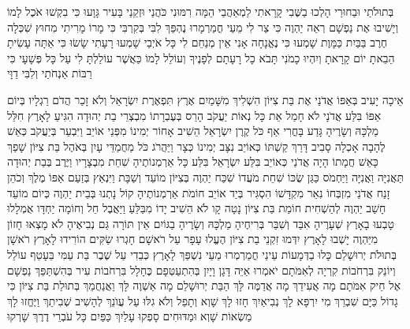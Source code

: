 \documentclass[../main/main.tex]{subfiles}
\begin{document}
\begin{multicols*}{\ncols}
בְּתוּלֹתַי וּבַחוּרַי הָלְכוּ בַשֶּׁבִי \ClosedSection{}קָרָאתִי לַמְאַהֲבַי הֵמָּה רִמּוּנִי כֹּהֲנַי וּזְקֵנַי בָּעִיר גָּוָעוּ כִּי בִקְשׁוּ אֹכֶל לָמוֹ וְיָשִׁיבוּ אֶת נַפְשָׁם \ClosedSection{}רְאֵה יַהְוֶה כִּי צַר לִי מֵעַי חֳמַרְמָרוּ נֶהְפַּךְ לִבִּי בְּקִרְבִּי כִּי מָרוֹ מָרִיתִי מִחוּץ שִׁכְּלָה חֶרֶב בַּבַּיִת כַּמָּוֶת \ClosedSection{}שָׁמְעוּ כִּי נֶאֱנָחָה אָנִי אֵין מְנַחֵם לִי כָּל אֹיְבַי שָׁמְעוּ רָעָתִי שָׂשׂוּ כִּי אַתָּה עָשִׂיתָ הֵבֵאתָ יוֹם קָרָאתָ וְיִהְיוּ כָמֹנִי \ClosedSection{}תָּבֹא כָל רָעָתָם לְפָנֶיךָ וְעוֹלֵל לָמוֹ כַּאֲשֶׁר עוֹלַלְתָּ לִי עַל כָּל פְּשָׁעָי כִּי רַבּוֹת אַנְחֹתַי וְלִבִּי דַוָּי\OpenSection{}\par
{}אֵיכָה יָעִיב בְּאַפּוֹ אֲדֹנַי אֶת בַּת צִיּוֹן הִשְׁלִיךְ מִשָּׁמַיִם אֶרֶץ תִּפְאֶרֶת יִשְׂרָאֵל וְלֹא זָכַר הֲדֹם רַגְלָיו בְּיוֹם אַפּוֹ \ClosedSection{}בִּלַּע אֲדֹנָי לֹא חָמַל אֵת כָּל נְאוֹת יַעֲקֹב הָרַס בְּעֶבְרָתוֹ מִבְצְרֵי בַת יְהוּדָה הִגִּיעַ לָאָרֶץ חִלֵּל מַלְכָּהּ\SubEnd{} וְשָׂרֶיהָ \ClosedSection{}גָּדַע בָּחֳרִי אַף כֹּל קֶרֶן יִשְׂרָאֵל הֵשִׁיב אָחוֹר יְמִינוֹ מִפְּנֵי אוֹיֵב וַיִּבְעַר בְּיַעֲקֹב כְּאֵשׁ לֶהָבָה אָכְלָה סָבִיב \ClosedSection{}דָּרַךְ קַשְׁתּוֹ כְּאוֹיֵב נִצָּב יְמִינוֹ כְּצָר וַיַּהֲרֹג כֹּל מַחֲמַדֵּי עָיִן בְּאֹהֶל בַּת צִיּוֹן שָׁפַךְ כָּאֵשׁ חֲמָתוֹ \ClosedSection{}הָיָה אֲדֹנַי כְּאוֹיֵב בִּלַּע יִשְׂרָאֵל בִּלַּע כָּל אַרְמְנוֹתֶיהָ שִׁחֵת מִבְצָרָיו וַיֶּרֶב בְּבַת יְהוּדָה תַּאֲנִיָּה וַאֲנִיָּה \ClosedSection{}וַיַּחְמֹס כַּגַּן שֻׂכּוֹ שִׁחֵת מֹעֲדוֹ שִׁכַּח יַהְוֶה בְּצִיּוֹן מוֹעֵד וְשַׁבָּת וַיִּנְאַץ בְּזַעַם אַפּוֹ מֶלֶךְ וְכֹהֵן \ClosedSection{}זָנַח אֲדֹנַי מִזְבְּחוֹ נִאֵר מִקְדָּשׁוֹ הִסְגִּיר בְּיַד אוֹיֵב חוֹמֹת אַרְמְנוֹתֶיהָ קוֹל נָתְנוּ בְּבֵית יַהְוֶה כְּיוֹם מוֹעֵד \ClosedSection{}חָשַׁב יַהְוֶה לְהַשְׁחִית חוֹמַת בַּת צִיּוֹן נָטָה קָו לֹא הֵשִׁיב יָדוֹ מִבַּלֵּעַ וַיַּאֲבֶל חֵל וְחוֹמָה יַחְדָּו אֻמְלָלוּ \ClosedSection{}טָבְעוּ בָאָרֶץ שְׁעָרֶיהָ אִבַּד וְשִׁבַּר בְּרִיחֶיהָ מַלְכָּהּ וְשָׂרֶיהָ בַגּוֹיִם אֵין תּוֹרָה גַּם נְבִיאֶיהָ לֹא מָצְאוּ חָזוֹן מִיַּהְוֶה \ClosedSection{}יָשְׁבוּ\SubEnd{} לָאָרֶץ יִדְּמוּ זִקְנֵי בַת צִיּוֹן הֶעֱלוּ עָפָר עַל רֹאשָׁם חָגְרוּ שַׂקִּים הוֹרִידוּ לָאָרֶץ רֹאשָׁן בְּתוּלֹת יְרוּשָׁלֵם \ClosedSection{}כָּלוּ בַדְּמָעוֹת עֵינַי חֳמַרְמְרוּ מֵעַי נִשְׁפַּךְ לָאָרֶץ כְּבֵדִי עַל שֶׁבֶר בַּת עַמִּי בֵּעָטֵף עוֹלֵל וְיוֹנֵק בִּרְחֹבוֹת קִרְיָה \ClosedSection{}לְאִמֹּתָם יֹאמְרוּ אַיֵּה דָּגָן וָיָיִן בְּהִתְעַטְּפָם כֶּחָלָל בִּרְחֹבוֹת עִיר בְּהִשְׁתַּפֵּךְ נַפְשָׁם אֶל חֵיק אִמֹּתָם \ClosedSection{}מָה אֲעִידֵךְ מָה אֲדַמֶּה לָּךְ הַבַּת יְרוּשָׁלֵם מָה אַשְׁוֶה לָּךְ וַאֲנַחֲמֵךְ בְּתוּלַת בַּת צִיּוֹן כִּי גָדוֹל כַּיָּם שִׁבְרֵךְ מִי יִרְפָּא לָךְ \ClosedSection{}נְבִיאַיִךְ חָזוּ לָךְ שָׁוְא וְתָפֵל וְלֹא גִלּוּ עַל עֲוֺנֵךְ לְהָשִׁיב שְׁבִיתֵךְ וַיֶּחֱזוּ לָךְ מַשְׂאוֹת שָׁוְא וּמַדּוּחִים \ClosedSection{}סָפְקוּ עָלַיִךְ כַּפַּיִם כָּל עֹבְרֵי דֶרֶךְ שָׁרְקוּ 
\end{multicols*}
\end{document}
